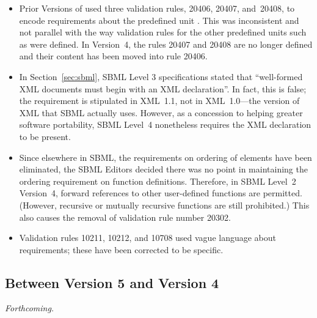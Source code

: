 \begin{itemize}
\item Prior Versions of \sbmltwo used three validation rules,
  20406, 20407, and~20408, to encode requirements about the
  predefined unit .  This was inconsistent and not
  parallel with the way validation rules for the other predefined
  units such as  were defined.  In Version~4, the
  rules 20407 and 20408 are no longer defined and their content
  has been moved into rule 20406.


\item In Section~\ref{sec:sbml}, SBML Level 3 specifications
  stated that ``well-formed XML documents must begin with an XML
  declaration''.  In fact, this is false; the requirement is
  stipulated in XML~1.1, not in XML~1.0---the version of XML that
  SBML actually uses.  However, as a concession to helping greater
  software portability, SBML Level~4 nonetheless requires the XML
  declaration to be present.

\item Since elsewhere in SBML, the requirements on ordering of
  elements have been eliminated, the SBML Editors decided there
  was no point in maintaining the ordering requirement on function
  definitions.  Therefore, in SBML Level~2 Version~4, forward
  references to other user-defined functions are permitted.
  (However, recursive or mutually recursive functions are still
  prohibited.)  This also causes the removal of validation rule
  number 20302.

\item Validation rules 10211, 10212, and 10708 used vague language
  about requirements; these have been corrected to be specific.

\end{itemize}


\subsection{Between Version 5 and Version 4}

\emph{Forthcoming.}


\renewcommand{\thesubsection}{\Alph{section}.\arabic{subsection}}
